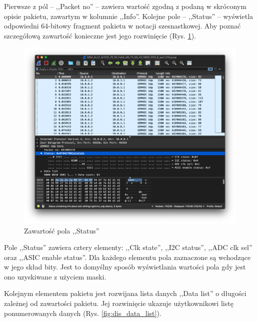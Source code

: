 \documentclass[a4paper, 12pt, twoside, openright]{article}
\begin{document}
Pierwsze z pól -- ,,Packet no'' -- zawiera wartość zgodną z podaną w skróconym opisie pakietu, zawartym w kolumnie ,,Info''. Kolejne pole -- ,,Status'' --
wyświetla odpowiedni 64-bitowy fragment pakietu w notacji szesnastkowej. Aby poznać szczegółową zawartość konieczne jest jego rozwinięcie (Rys. \ref{fig:dis_status}).

	\begin{figure}[h]
		\centering
			\includegraphics[width=1.0\textwidth]{img/screenshot_dissector_status.png}
		\caption{Zawartość pola ,,Status''}
		\label{fig:dis_status}
	\end{figure}

Pole ,,Status'' zawiera cztery elementy: ,,Clk state'', ,,I2C status'', ,,ADC clk sel'' oraz ,,ASIC enable status''. Dla każdego elementu
pola zaznaczone są wchodzące w jego skład bity. Jest to domyślny sposób wyświetlania wartości pola gdy jest ono uzyskiwane z użyciem maski.

Kolejnym elementem pakietu jest rozwijana lista danych ,,Data list'' o długości zależnej od zawartości pakietu. Jej rozwinięcie ukazuje użytkownikowi
listę ponumerowanych danych (Rys. \ref{fig:dis_data_list}).
\end{document}

